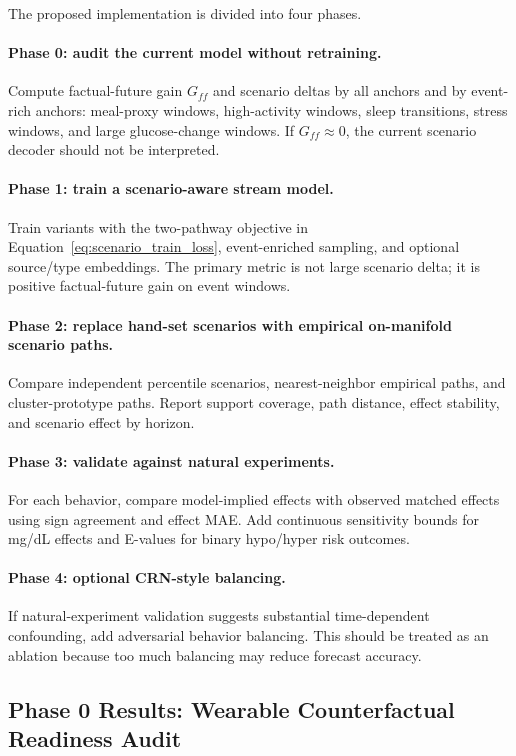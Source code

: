 The proposed implementation is divided into four phases.

\paragraph{Phase 0: audit the current model without retraining.}
Compute factual-future gain $G_{ff}$ and scenario deltas by all anchors and by event-rich anchors: meal-proxy windows, high-activity windows, sleep transitions, stress windows, and large glucose-change windows. If $G_{ff}\approx 0$, the current scenario decoder should not be interpreted.

\paragraph{Phase 1: train a scenario-aware stream model.}
Train variants with the two-pathway objective in Equation~\eqref{eq:scenario_train_loss}, event-enriched sampling, and optional source/type embeddings. The primary metric is not large scenario delta; it is positive factual-future gain on event windows.

\paragraph{Phase 2: replace hand-set scenarios with empirical on-manifold scenario paths.}
Compare independent percentile scenarios, nearest-neighbor empirical paths, and cluster-prototype paths. Report support coverage, path distance, effect stability, and scenario effect by horizon.

\paragraph{Phase 3: validate against natural experiments.}
For each behavior, compare model-implied effects with observed matched effects using sign agreement and effect MAE. Add continuous sensitivity bounds for mg/dL effects and E-values for binary hypo/hyper risk outcomes.

\paragraph{Phase 4: optional CRN-style balancing.}
If natural-experiment validation suggests substantial time-dependent confounding, add adversarial behavior balancing. This should be treated as an ablation because too much balancing may reduce forecast accuracy.

\subsection{Phase 0 Results: Wearable Counterfactual Readiness Audit}
\label{subsec:cf_phase0_results}

